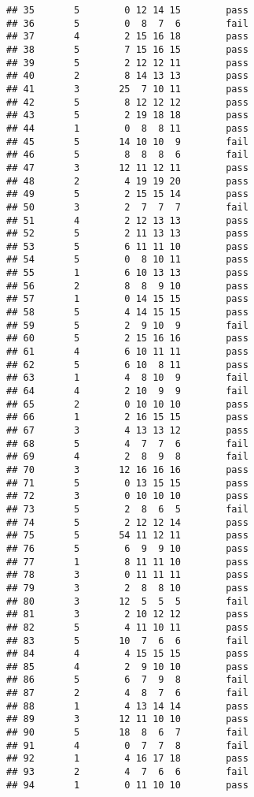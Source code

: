 \documentclass[
]{article}
\begin{document}
\begin{verbatim}
## 35       5        0 12 14 15        pass
## 36       5        0  8  7  6        fail
## 37       4        2 15 16 18        pass
## 38       5        7 15 16 15        pass
## 39       5        2 12 12 11        pass
## 40       2        8 14 13 13        pass
## 41       3       25  7 10 11        pass
## 42       5        8 12 12 12        pass
## 43       5        2 19 18 18        pass
## 44       1        0  8  8 11        pass
## 45       5       14 10 10  9        fail
## 46       5        8  8  8  6        fail
## 47       3       12 11 12 11        pass
## 48       2        4 19 19 20        pass
## 49       5        2 15 15 14        pass
## 50       3        2  7  7  7        fail
## 51       4        2 12 13 13        pass
## 52       5        2 11 13 13        pass
## 53       5        6 11 11 10        pass
## 54       5        0  8 10 11        pass
## 55       1        6 10 13 13        pass
## 56       2        8  8  9 10        pass
## 57       1        0 14 15 15        pass
## 58       5        4 14 15 15        pass
## 59       5        2  9 10  9        fail
## 60       5        2 15 16 16        pass
## 61       4        6 10 11 11        pass
## 62       5        6 10  8 11        pass
## 63       1        4  8 10  9        fail
## 64       4        2 10  9  9        fail
## 65       2        0 10 10 10        pass
## 66       1        2 16 15 15        pass
## 67       3        4 13 13 12        pass
## 68       5        4  7  7  6        fail
## 69       4        2  8  9  8        fail
## 70       3       12 16 16 16        pass
## 71       5        0 13 15 15        pass
## 72       3        0 10 10 10        pass
## 73       5        2  8  6  5        fail
## 74       5        2 12 12 14        pass
## 75       5       54 11 12 11        pass
## 76       5        6  9  9 10        pass
## 77       1        8 11 11 10        pass
## 78       3        0 11 11 11        pass
## 79       3        2  8  8 10        pass
## 80       3       12  5  5  5        fail
## 81       3        2 10 12 12        pass
## 82       5        4 11 10 11        pass
## 83       5       10  7  6  6        fail
## 84       4        4 15 15 15        pass
## 85       4        2  9 10 10        pass
## 86       5        6  7  9  8        fail
## 87       2        4  8  7  6        fail
## 88       1        4 13 14 14        pass
## 89       3       12 11 10 10        pass
## 90       5       18  8  6  7        fail
## 91       4        0  7  7  8        fail
## 92       1        4 16 17 18        pass
## 93       2        4  7  6  6        fail
## 94       1        0 11 10 10        pass

\end{verbatim}
\end{document}
